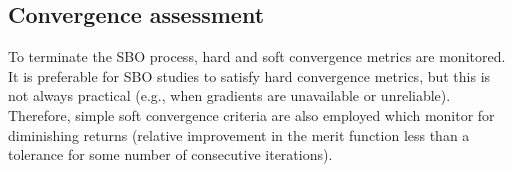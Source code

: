 
\subsection{Convergence assessment} \label{sbm:sblm_con_hard}

To terminate the SBO process, hard and soft convergence metrics are
monitored.  It is preferable for SBO studies to satisfy hard
convergence metrics, but this is not always practical (e.g., when
gradients are unavailable or unreliable).  Therefore, simple soft
convergence criteria are also employed which monitor for diminishing
returns (relative improvement in the merit function less than a
tolerance for some number of consecutive iterations).

